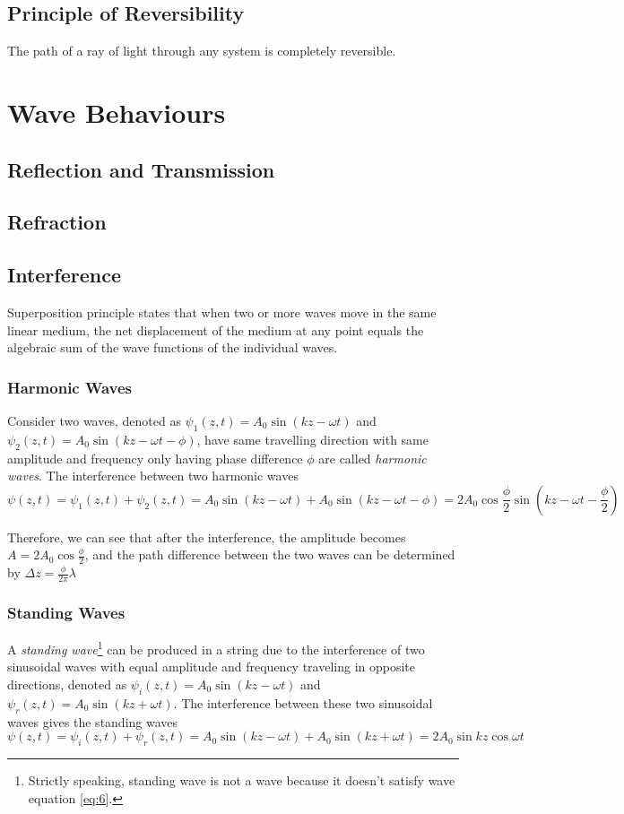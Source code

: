 \documentclass[UTF8]{book}
\begin{document}
\subsection{Principle of Reversibility}
The path of a ray of light through any
system is completely reversible.

\section{Wave Behaviours}


\subsection{Reflection and Transmission}


\subsection{Refraction}


\subsection{Interference}
Superposition principle states that when two or more waves move in the same linear medium, the net displacement of the medium at any point equals the algebraic sum of the wave functions of the individual waves.


\subsubsection{Harmonic Waves}
Consider two waves, denoted as $\psi _1(z,t)=A_0\sin (kz-\omega t)$ and $\psi _2(z,t)=A_0\sin (kz-\omega t -\phi)$, have same travelling direction with same amplitude and frequency only having phase difference $\phi $ are called \emph{harmonic waves}. The interference between two harmonic waves
\[\psi (z,t)=\psi _1(z,t)+\psi _2(z,t)=A_0\sin (kz-\omega t)+A_0\sin (kz-\omega t -\phi)=2A_0\cos \frac{\phi }{2}\sin (kz-\omega t-\frac{\phi }{2})\]

Therefore, we can see that after the interference, the amplitude becomes $A=2A_0\cos \frac{\phi }{2}$, and the path difference between the two waves can be determined by $\Delta z=\frac{\phi}{2\pi}\lambda $


\subsubsection{Standing Waves}
A \emph{standing wave}\footnote{Strictly speaking, standing wave is not a wave because it doesn't satisfy wave equation \eqref{eq:6}.} can be produced in a string due to the interference of two sinusoidal waves with equal amplitude and frequency traveling in opposite directions, denoted as $\psi _i(z,t)=A_0\sin (kz-\omega t)$ and $\psi _r(z,t)=A_0\sin (kz+\omega t)$. The interference between these two sinusoidal waves gives the standing waves
\[\psi (z,t)=\psi _i(z,t)+\psi _r(z,t)=A_0\sin (kz-\omega t)+A_0\sin (kz+\omega t)=2A_0\sin kz\cos \omega t \]
\end{document}
